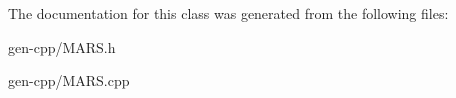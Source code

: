 The documentation for this class was generated from the following files\+:\begin{DoxyCompactItemize}
\item 
gen-\/cpp/M\+A\+R\+S.\+h\item 
gen-\/cpp/M\+A\+R\+S.\+cpp\end{DoxyCompactItemize}
